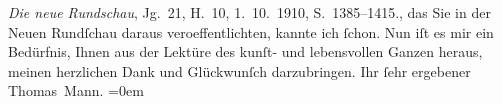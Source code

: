 \begin{ledgroupsized}[t]{13cm}
{{{                                \emph{Die neue Rundschau}, Jg. 21, H. 10,
                                1. 10. 1910, S. 1385–1415.}}}\label{K_L01986_1h}, das Sie in
                    der Neuen Rundſchau daraus veroeffentlichten,
                    kannte ich ſchon. Nun {\pb}iſt es mir ein
                    Bedürfnis, Ihnen aus der Lektüre des kunſt- und lebensvollen Ganzen heraus,
                    meinen herzlichen Dank und Glückwunſch darzubringen.\pend
           \pstart
           Ihr ſehr ergebener{\\[\baselineskip]}\spacefill\mbox{Thomas Mann.}\pend
           \leftskip=0em{}\endnumbering{}\end{ledgroupsized}  \newcommand{\dateiname}{L01986}\newcommand{\titel}{Thomas Mann an Arthur Schnitzler, 22. 11. 1910}\newcommand{\editorInnen}{Martin Anton Müller und Gerd-Hermann Susen}
            \footnotesize
\begin{ledgroupsized}[t]{11.5cm}
\end{ledgroupsized}
         
      